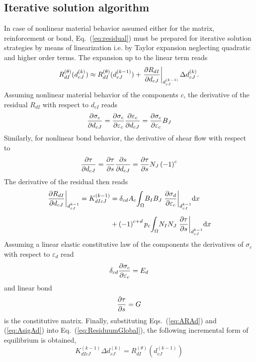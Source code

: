 \documentclass[main.tex]{subfiles}
\begin{document}
\subsection{Iterative solution algorithm}
In case of nonlinear material behavior assumed either for the matrix, reinforcement or bond, 
Eq.~(\ref{eq:residual}) must be prepared for iterative solution
strategies by means of linearization i.e. by Taylor expansion neglecting
quadratic and higher order terms. The expansion up to the linear term reads
\begin{equation}
\label{eq:ResiduumGlobal}
R^{(\theta)}_{dI}(d_{cJ}^{(k)})
\approx
R^{(\theta)}_{dI}(d_{cJ}^{(k-1)})
+
\left.
\mbox{$\displaystyle\frac{\partial { R_{dI} }}{\partial {d_{cJ}}}$}
\right|_{d_{cJ}^{(k-1)}}
\Delta d_{cJ}^{(k)}.
\end{equation}
Assuming nonlinear material behavior of the components $c$, the derivative of the residual $R_{dI}$ with respect to $d_{cI}$ reads
\begin{equation} \label{eq:ARAd}
\mbox{$\displaystyle\frac{\partial {\sigma_c}}{\partial {d_{cJ}}}$}
=
\mbox{$\displaystyle\frac{\partial {\sigma_c}}{\partial {\varepsilon_{c}}}$} \mbox{$\displaystyle\frac{\partial {\varepsilon_c}}{\partial {d_{cJ}}}$}
=
\mbox{$\displaystyle\frac{\partial {\sigma_c}}{\partial {\varepsilon_{c}}}$} B_{J} 
\end{equation}
Similarly, for nonlinear bond behavior, the derivative of shear flow with respect to 
\begin{equation} \label{eq:ARAd}
\mbox{$\displaystyle\frac{\partial {\tau}}{\partial {d_{cJ}}}$}
=
\mbox{$\displaystyle\frac{\partial {\tau}}{\partial {s}}$} \mbox{$\displaystyle\frac{\partial {s}}{\partial {d_{cJ}}}$}
=
\mbox{$\displaystyle\frac{\partial {\tau}}{\partial {s}}$} N_{J} \left(-1\right)^{c} 
\end{equation}
The derivative of the residual then reads
\begin{align} \label{eq:ARAd}
\left. \mbox{$\displaystyle\frac{\partial { R_{dI} }}{\partial {d_{cJ}}}$}\right|_{d_{cJ}^{k-1}} = K_{dIcJ}^{(k-1)} 
& = 
\delta_{cd} A_c \mbox{$\displaystyle\int_{\Omega}^{}$}{ B_{I} B_{J} \left.\mbox{$\displaystyle\frac{\partial {\sigma_d}}{\partial {\varepsilon_{c}}}$}\right|_{d_{cJ}^{k-1}}  }
 \mathrm{d}x \\[2mm]
& +
\left(-1\right)^{c+d}
p_c \mbox{$\displaystyle\int_{\Omega}^{}$}{   N_{I} N_{J} \left.\mbox{$\displaystyle\frac{\partial {\tau}}{\partial {s}}$}\right|_{d_{cJ}^{k-1}}   }
 \mathrm{d}x
\end{align}
Assuming a linear elastic constitutive law of the components the derivatives of $\sigma_c$ with respect to $\varepsilon_d$ read 
\begin{equation} \label{eq:AsigAd}
\delta_{cd} \mbox{$\displaystyle\frac{\partial {\sigma_c}}{\partial {\varepsilon_c}}$} = E_d
\end{equation}
and linear bond 
\begin{equation} \label{eq:D_matrix}
\mbox{$\displaystyle\frac{\partial {\tau}}{\partial {s}}$} = G
\end{equation}
is the constitutive matrix. Finally, substituting Eqs.~(\ref{eq:ARAd}) and (\ref{eq:AsigAd}) into Eq.~(\ref{eq:ResiduumGlobal}), the following incremental form of equilibrium is obtained,
\begin{equation} \label{eq:incre_equi}
K_{dIcJ}^{(k-1)} \Delta d_{cJ}^{(k)} = R^{(\theta)}_{dI}(d_{cJ}^{(k-1)})
\end{equation}
\end{document}
